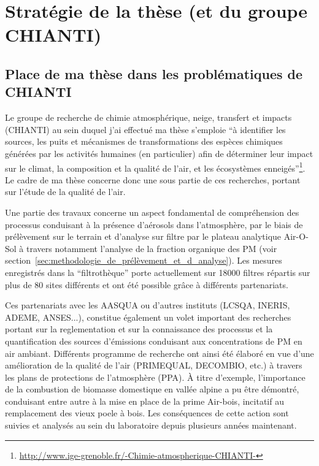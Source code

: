 
\section{Stratégie de la thèse (et du groupe CHIANTI)}%
\label{sec:stratégie__du_groupe_chianti}

\subsection{Place de ma thèse dans les problématiques de CHIANTI}%
\label{sub:place_de_ma_thèse_dans_les_problématiques_de_chianti}

Le groupe de recherche de chimie atmosphérique, neige, transfert et impacts (CHIANTI) au
sein duquel j'ai effectué ma thèse s'emploie ``à identifier les sources, les puits et
mécanismes de transformations des espèces chimiques générées par les activités humaines
(en particulier) afin de déterminer leur impact sur le climat, la composition et la
qualité de l’air, et les écosystèmes
enneigés''\footnote{\url{http://www.ige-grenoble.fr/-Chimie-atmospherique-CHIANTI-}}.
Le cadre de ma thèse concerne donc une sous partie de ces recherches, portant sur l'étude
de la qualité de l'air.

Une partie des travaux concerne un aspect fondamental de compréhension des processus
conduisant à la présence d'aérosols dans l'atmosphère, par le biais de prélèvement sur le
terrain et d'analyse sur filtre par le plateau analytique Air-O-Sol à travers notamment
l'analyse de la fraction organique des PM (voir
section~\ref{sec:methodologie_de_prélèvement_et_d_analyse}).
Les mesures enregistrés dans la ``filtrothèque'' porte actuellement sur \num{18000}
filtres répartis sur plus de 80 sites différents et ont été possible grâce à différents
partenariats.

Ces partenariats avec les AASQUA ou d'autres instituts (LCSQA, INERIS, ADEME, ANSES...),
constitue également un volet important des recherches portant sur la reglementation et sur
la connaissance des processus et la quantification des sources d'émissions conduisant aux
concentrations de PM en air ambiant.
Différents programme de recherche ont ainsi été élaboré en vue d'une amélioration de la
qualité de l'air (PRIMEQUAL, DECOMBIO, etc.) à travers les plans de protections de
l'atmosphère (PPA). À titre d'exemple, l'importance
de la combustion de biomasse domestique en vallée alpine a pu être démontré, conduisant
entre autre à la mise en place de la prime Air-bois, incitatif au remplacement des vieux
poele à bois. Les conséquences de cette action sont suivies et
analysés au sein du laboratoire depuis plusieurs années maintenant.

